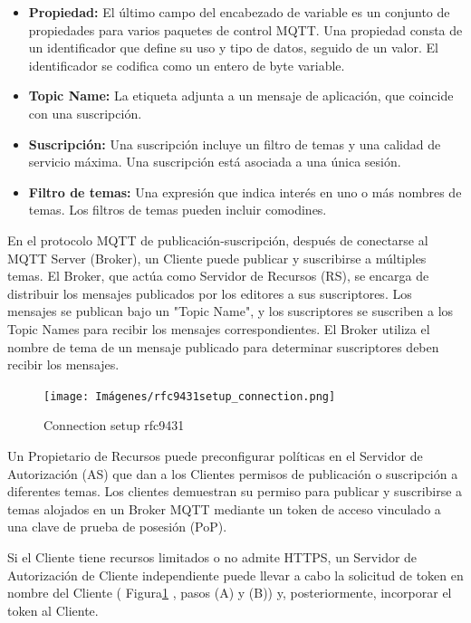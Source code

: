 \begin{itemize}
    \item \textbf{Propiedad: }El último campo del encabezado de variable es un conjunto de propiedades para varios paquetes de control MQTT. Una propiedad consta de un identificador que define su uso y tipo de datos, seguido de un valor. El identificador se codifica como un entero de byte variable.
    \item \textbf{Topic Name: }La etiqueta adjunta a un mensaje de aplicación, que coincide con una suscripción.
    \item \textbf{Suscripción: }Una suscripción incluye un filtro de temas y una calidad de servicio máxima. Una suscripción está asociada a una única sesión.
    \item \textbf{Filtro de temas: }Una expresión que indica interés en uno o más nombres de temas. Los filtros de temas pueden incluir comodines.
\end{itemize}


En el protocolo MQTT de publicación-suscripción, después de conectarse al MQTT Server (Broker), un Cliente puede publicar y suscribirse a múltiples temas.  El Broker, que actúa como Servidor de Recursos (RS), se encarga de distribuir los mensajes publicados por los editores a sus suscriptores.
Los mensajes se publican bajo un "Topic Name", y los suscriptores se suscriben a los Topic Names para recibir los mensajes correspondientes.  El Broker utiliza el nombre de tema de un mensaje publicado para determinar suscriptores deben recibir los mensajes. 

\begin{figure}[ht] %
    \centering
    \texttt{[image: Imágenes/rfc9431setup\_connection.png]}
    \caption{Connection setup rfc9431}
    \label{fig:setup_MQTT}
\end{figure}

Un Propietario de Recursos puede preconfigurar políticas en el Servidor de Autorización (AS) que dan a los Clientes permisos de publicación o suscripción a diferentes temas.
Los clientes demuestran su permiso para publicar y suscribirse a temas alojados en un Broker MQTT mediante un token de acceso vinculado a una clave de prueba de posesión (PoP).

Si el Cliente tiene recursos limitados o no admite HTTPS, un Servidor de Autorización de Cliente independiente puede llevar a cabo la solicitud de token en nombre del Cliente ( Figura\ref{fig:setup_MQTT} , pasos (A) y (B)) y, posteriormente, incorporar el token al Cliente.\cite{rfc9431}

